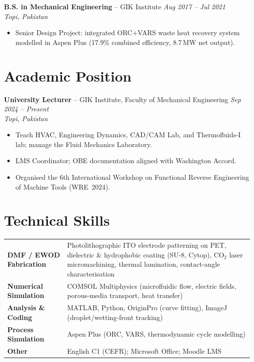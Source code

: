 \documentclass[11pt,a4paper]{article}
\begin{document}
\vspace{4pt}
\textbf{B.S. in Mechanical Engineering} -- GIK Institute
\hfill \textit{Aug 2017 -- Jul 2021}\\
\textit{Topi, Pakistan}
\begin{itemize}
  \item Senior Design Project: integrated ORC+VARS waste heat recovery system
        modelled in Aspen Plus (17.9\% combined efficiency, 8.7\,MW net output).
\end{itemize}

\section{Academic Position}

\textbf{University Lecturer} -- GIK Institute, Faculty of Mechanical Engineering
\hfill \textit{Sep 2024 -- Present}\\
\textit{Topi, Pakistan}
\begin{itemize}
  \item Teach HVAC, Engineering Dynamics, CAD/CAM Lab, and Thermofluids-I lab;
        manage the Fluid Mechanics Laboratory.
  \item LMS Coordinator; OBE documentation aligned with Washington Accord.
  \item Organised the 6th International Workshop on Functional Reverse Engineering
        of Machine Tools (WRE~2024).
\end{itemize}

\section{Technical Skills}

\begin{tabularx}{\textwidth}{@{}>{\bfseries}lX@{}}
DMF / EWOD Fabrication
  & Photolithographic ITO electrode patterning on PET, dielectric \& hydrophobic
    coating (SU-8, Cytop), CO$_2$ laser micromachining, thermal lamination,
    contact-angle characterisation \\[3pt]
Numerical Simulation
  & COMSOL Multiphysics (microfluidic flow, electric fields, porous-media
    transport, heat transfer) \\[3pt]
Analysis \& Coding
  & MATLAB, Python, OriginPro (curve fitting), ImageJ (droplet/wetting-front
    tracking) \\[3pt]
Process Simulation
  & Aspen Plus (ORC, VARS, thermodynamic cycle modelling) \\[3pt]
Other
  & English C1 (CEFR); Microsoft Office; Moodle LMS \\
\end{tabularx}
\end{document}
